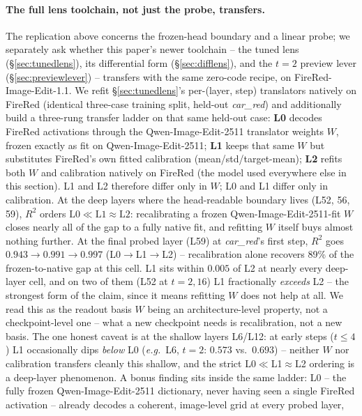 \documentclass[10pt,twocolumn,letterpaper]{article}
\newcommand{\model}{Qwen-Image-Edit-2511}
\begin{document}
\paragraph{The full lens toolchain, not just the probe, transfers.} The
replication above concerns the frozen-head boundary and a linear probe;
we separately ask whether this paper's newer toolchain -- the tuned
lens (\S\ref{sec:tunedlens}), its differential form
(\S\ref{sec:difflens}), and the $t{=}2$ preview lever
(\S\ref{sec:previewlever}) -- transfers with the same zero-code recipe,
on FireRed-Image-Edit-1.1. We refit \S\ref{sec:tunedlens}'s
per-(layer, step) translators natively on FireRed (identical
three-case training split, held-out \emph{car\_red}) and additionally
build a three-rung transfer ladder on that same held-out case:
\textbf{L0} decodes FireRed activations through the \model{} translator
weights $W$, frozen exactly as fit on \model{}; \textbf{L1} keeps that
same $W$ but substitutes FireRed's own fitted calibration
(mean/std/target-mean); \textbf{L2} refits both $W$ and calibration
natively on FireRed (the model used everywhere else in this section).
L1 and L2 therefore differ only in $W$; L0 and L1 differ only in
calibration. At the deep layers where the head-readable boundary lives
(L52, 56, 59), $R^2$ orders $\text{L0} \ll \text{L1} \approx \text{L2}$:
recalibrating a frozen \model{}-fit $W$ closes nearly all of the gap to
a fully native fit, and refitting $W$ itself buys almost nothing
further. At the final probed layer (L59) at \emph{car\_red}'s first step,
$R^2$ goes $0.943 \to 0.991 \to 0.997$ (L0$\to$L1$\to$L2) -- recalibration alone
recovers 89\% of the frozen-to-native gap at this cell. L1 sits
within $0.005$ of L2 at nearly every deep-layer cell, and on two of them
(L52 at $t{=}2, 16$) L1 fractionally \emph{exceeds} L2 -- the strongest
form of the claim, since it means refitting $W$ does not help at all.
We read this as the readout basis $W$ being an architecture-level
property, not a checkpoint-level one -- what a new checkpoint needs is
recalibration, not a new basis. The one honest caveat is at the
shallow layers L6/L12: at early steps ($t\le4$) L1 occasionally dips
\emph{below} L0 (\emph{e.g.}\ L6, $t{=}2$: $0.573$ vs.\ $0.693$) --
neither $W$ nor calibration transfers cleanly this shallow, and the
strict L0$\ll$L1$\approx$L2 ordering is a deep-layer phenomenon. A
bonus finding sits inside the same ladder: L0 -- the fully frozen
\model{} dictionary, never having seen a single FireRed activation --
already decodes a coherent, image-level grid at every probed layer,
\end{document}
